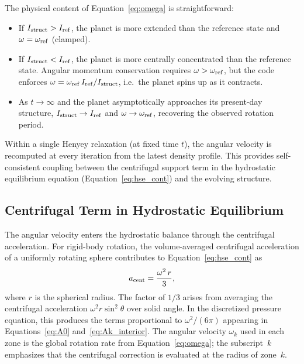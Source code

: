 \documentclass{aastex631}
\begin{document}
The physical content of Equation~\eqref{eq:omega} is straightforward:
\begin{itemize}
  \item If $I_{\rm struct} > I_{\rm ref}$, the planet is more extended
    than the reference state and $\omega = \omega_{\rm ref}$ (clamped).
  \item If $I_{\rm struct} < I_{\rm ref}$, the planet is more centrally
    concentrated than the reference state.  Angular momentum
    conservation requires $\omega > \omega_{\rm ref}$, but the code
    enforces $\omega = \omega_{\rm ref}\,I_{\rm ref}/I_{\rm struct}$,
    i.e.\ the planet spins up as it contracts.
  \item As $t\to\infty$ and the planet asymptotically approaches its
    present-day structure, $I_{\rm struct} \to I_{\rm ref}$ and
    $\omega \to \omega_{\rm ref}$, recovering the observed rotation
    period.
\end{itemize}

Within a single Henyey relaxation (at fixed time $t$), the angular
velocity is recomputed at every iteration from the latest density
profile.  This provides self-consistent coupling between the
centrifugal support term in the hydrostatic equilibrium equation
(Equation~\ref{eq:hse_cont}) and the evolving structure.

\subsection{Centrifugal Term in Hydrostatic Equilibrium}

The angular velocity enters the hydrostatic balance through the
centrifugal acceleration.  For rigid-body rotation, the
volume-averaged centrifugal acceleration of a uniformly rotating
sphere contributes to Equation~\eqref{eq:hse_cont} as
\begin{equation}\label{eq:cent_accel}
  a_{\rm cent} = \frac{\omega^2\,r}{3},
\end{equation}
where $r$ is the spherical radius.  The factor of $1/3$ arises from
averaging the centrifugal acceleration $\omega^2 r\sin^2\theta$ over
solid angle.  In the discretized pressure equation, this produces the
terms proportional to $\omega^2/(6\pi)$ appearing in
Equations~\eqref{eq:A0} and~\eqref{eq:Ak_interior}.  The angular
velocity $\omega_k$ used in each zone is the global rotation rate from
Equation~\eqref{eq:omega}; the subscript~$k$ emphasizes that the
centrifugal correction is evaluated at the radius of zone~$k$.
\end{document}
